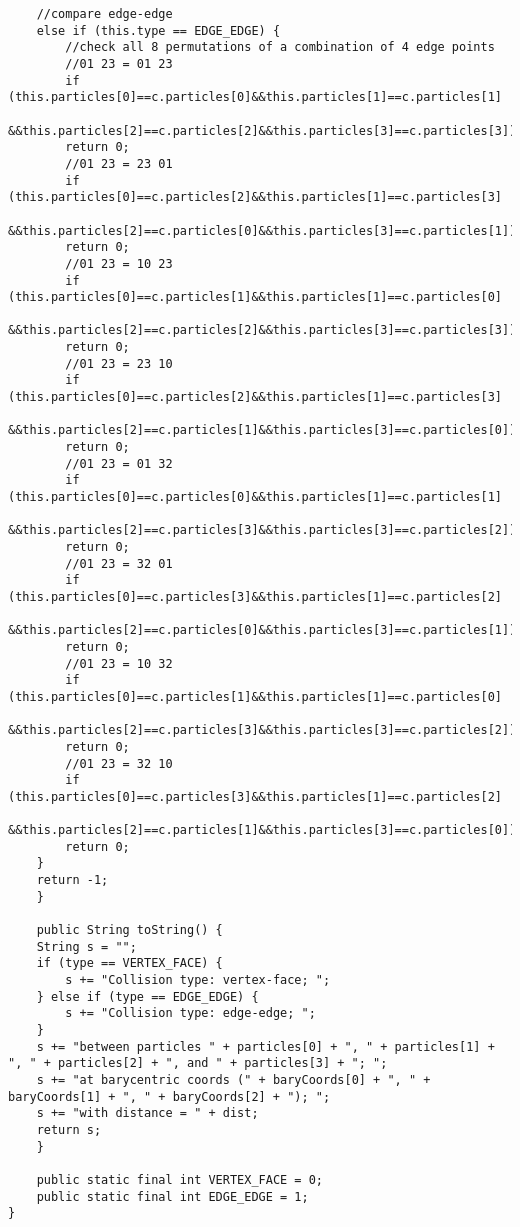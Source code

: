\begin{lstlisting}
	//compare edge-edge
	else if (this.type == EDGE_EDGE) {
	    //check all 8 permutations of a combination of 4 edge points
	    //01 23 = 01 23
	    if (this.particles[0]==c.particles[0]&&this.particles[1]==c.particles[1]
		&&this.particles[2]==c.particles[2]&&this.particles[3]==c.particles[3])
		return 0;
	    //01 23 = 23 01
	    if (this.particles[0]==c.particles[2]&&this.particles[1]==c.particles[3]
		&&this.particles[2]==c.particles[0]&&this.particles[3]==c.particles[1])
		return 0;
	    //01 23 = 10 23 
	    if (this.particles[0]==c.particles[1]&&this.particles[1]==c.particles[0]
		&&this.particles[2]==c.particles[2]&&this.particles[3]==c.particles[3])
		return 0;
	    //01 23 = 23 10
	    if (this.particles[0]==c.particles[2]&&this.particles[1]==c.particles[3]
		&&this.particles[2]==c.particles[1]&&this.particles[3]==c.particles[0])
		return 0;
	    //01 23 = 01 32
	    if (this.particles[0]==c.particles[0]&&this.particles[1]==c.particles[1]
		&&this.particles[2]==c.particles[3]&&this.particles[3]==c.particles[2])
		return 0;
	    //01 23 = 32 01
	    if (this.particles[0]==c.particles[3]&&this.particles[1]==c.particles[2]
		&&this.particles[2]==c.particles[0]&&this.particles[3]==c.particles[1])
		return 0;
	    //01 23 = 10 32
	    if (this.particles[0]==c.particles[1]&&this.particles[1]==c.particles[0]
		&&this.particles[2]==c.particles[3]&&this.particles[3]==c.particles[2])
		return 0;
	    //01 23 = 32 10
	    if (this.particles[0]==c.particles[3]&&this.particles[1]==c.particles[2]
		&&this.particles[2]==c.particles[1]&&this.particles[3]==c.particles[0])
		return 0;
	}
	return -1;
    }

    public String toString() {
	String s = "";
	if (type == VERTEX_FACE) {
	    s += "Collision type: vertex-face; ";
	} else if (type == EDGE_EDGE) {
	    s += "Collision type: edge-edge; ";
	}
	s += "between particles " + particles[0] + ", " + particles[1] + ", " + particles[2] + ", and " + particles[3] + "; ";
	s += "at barycentric coords (" + baryCoords[0] + ", " + baryCoords[1] + ", " + baryCoords[2] + "); ";
	s += "with distance = " + dist;
	return s;
    }

    public static final int VERTEX_FACE = 0;
    public static final int EDGE_EDGE = 1;
}\end{lstlisting}

